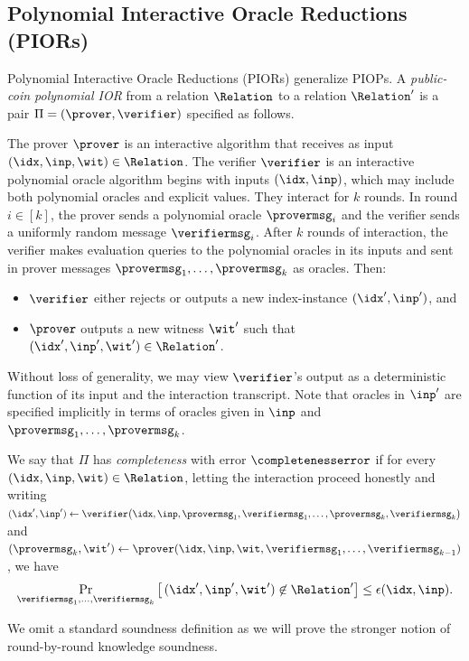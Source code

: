 % 


\subsection{Polynomial Interactive Oracle Reductions (PIORs)}
\label{sec:iors}

Polynomial Interactive Oracle Reductions (PIORs) generalize PIOPs. A \emph{public-coin polynomial IOR} from a relation $\Relation$ to a relation $\Relation'$ is a pair $\Pi = (\prover,\verifier)$ specified as follows.

The prover $\prover$ is an interactive algorithm that receives as input $(\idx,\inp,\wit)\in \Relation$.  The verifier $\verifier$ is an interactive polynomial oracle algorithm begins with inputs $(\idx,\inp)$, which may include both polynomial oracles and explicit values. They interact for $k$ rounds. In round $i\in[k]$, the prover sends a polynomial oracle $\provermsg_i$ and the verifier sends a uniformly random message $\verifiermsg_i$.  After $k$ rounds of interaction, the verifier makes evaluation queries to the polynomial oracles in its inputs and sent in prover messages $\provermsg_1,\dots,\provermsg_k$ as oracles. Then:
\begin{itemize}
  \item $\verifier$ either rejects or outputs a new index-instance $(\idx',\inp')$, and
  \item $\prover$ outputs a new witness $\wit'$ such that $(\idx',\inp',\wit') \in \Relation'$.
\end{itemize}

Without loss of generality, we may view $\verifier$'s output as a deterministic function of its input and the interaction transcript. Note that oracles in $\inp'$ are specified implicitly in terms of oracles given in $\inp$ and $\provermsg_1,\dots,\provermsg_k$.

\begin{definition}[Completeness]
\label{def:ior-completeness}
We say that $\Pi$ has \emph{completeness} with error $\completenesserror$ if for every $(\idx,\inp,\wit)\in \Relation$, letting the interaction proceed honestly and writing $(\idx',\inp') \gets \verifier\bigl(\idx,\inp,\provermsg_1,\verifiermsg_1,\dots,\provermsg_k,\verifiermsg_k\bigr)$ and $(\provermsg_k,\wit') \gets \prover(\idx,\inp,\wit,\verifiermsg_1,\dots,\verifiermsg_{k-1})$,
  we have
  \[
    \Pr_{\verifiermsg_1,\dots,\verifiermsg_k}\left[\, (\idx',\inp',\wit') \not\in \Relation' \right] \leq \epsilon(\idx,\inp).
  \]
\end{definition}
We omit a standard soundness definition as we will prove the stronger notion of round-by-round knowledge soundness.%


